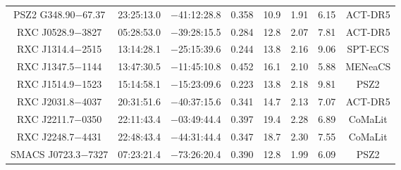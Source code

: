 \begin{table}
\begin{tabular}{cccccccc}
PSZ2 G348.90$-$67.37 & 23:25:13.0 & $-$41:12:28.8 & 0.358 & 10.9 & 1.91 & 6.15 & ACT-DR5 \\
RXC J0528.9$-$3827 & 05:28:53.0 & $-$39:28:15.5 & 0.284 & 12.8 & 2.07 & 7.81 & ACT-DR5 \\
RXC J1314.4$-$2515 & 13:14:28.1 & $-$25:15:39.6 & 0.244 & 13.8 & 2.16 & 9.06 & SPT-ECS \\
RXC J1347.5$-$1144 & 13:47:30.5 & $-$11:45:10.8 & 0.452 & 16.1 & 2.10 & 5.88 & MENeaCS \\
RXC J1514.9$-$1523 & 15:14:58.1 & $-$15:23:09.6 & 0.223 & 13.8 & 2.18 & 9.81 & PSZ2 \\
RXC J2031.8$-$4037 & 20:31:51.6 & $-$40:37:15.6 & 0.341 & 14.7 & 2.13 & 7.07 & ACT-DR5 \\
RXC J2211.7$-$0350 & 22:11:43.4 & $-$03:49:44.4 & 0.397 & 19.4 & 2.28 & 6.89 & CoMaLit \\
RXC J2248.7$-$4431 & 22:48:43.4 & $-$44:31:44.4 & 0.347 & 18.7 & 2.30 & 7.55 & CoMaLit \\
SMACS J0723.3$-$7327 & 07:23:21.4 & $-$73:26:20.4 & 0.390 & 12.8 & 1.99 & 6.09 & PSZ2 \\
\end{tabular}
\end{table}
